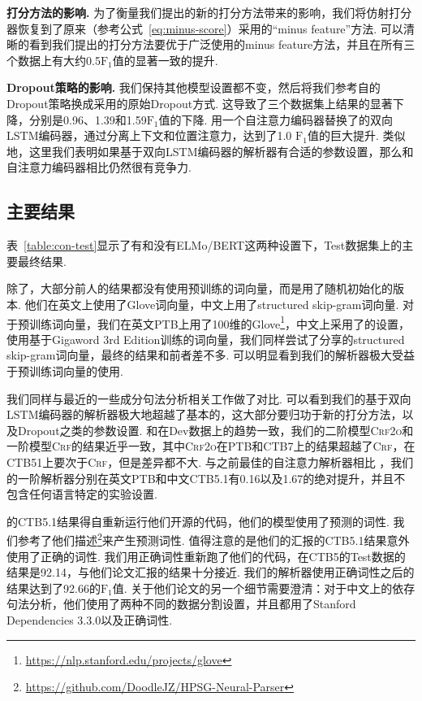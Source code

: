 \noindent\textbf{打分方法的影响.}
为了衡量我们提出的新的打分方法带来的影响，我们将仿射打分器恢复到了原来\citet{stern-etal-2017-minimal}（参考公式~\ref{eq:minus-score}）采用的``minus feature''方法.
可以清晰的看到我们提出的打分方法要优于广泛使用的minus feature方法，并且在所有三个数据上有大约0.5$\mathrm{F}_1$值的显著一致的提升.

\noindent\textbf{Dropout策略的影响.}
我们保持其他模型设置都不变，然后将我们参考自\citet{dozat-etal-2017-biaffine}的Dropout策略换成\citet{stern-etal-2017-minimal}采用的原始Dropout方式.
这导致了三个数据集上结果的显著下降，分别是0.96、1.39和1.59$\mathrm{F}_1$值的下降.
\citet{kitaev-klein-2018-constituency}用一个自注意力编码器替换了\citet{stern-etal-2017-minimal}的双向LSTM编码器，通过分离上下文和位置注意力，达到了1.0 $\mathrm{F}_1$值的巨大提升.
类似地，这里我们表明如果基于双向LSTM编码器的解析器有合适的参数设置，那么和自注意力编码器相比仍然很有竞争力.



\subsection{主要结果}
表~\ref{table:con-test}显示了有和没有ELMo/BERT这两种设置下，Test数据集上的主要最终结果.

除了\citet{zhou-zhao-2019-head}，大部分前人的结果都没有使用预训练的词向量，而是用了随机初始化的版本.
他们在英文上使用了Glove词向量，中文上用了structured skip-gram词向量.
对于预训练词向量，我们在英文PTB上用了100维的Glove\footnote{\url{https://nlp.stanford.edu/projects/glove}}，中文上采用了\citet{li-etal-2019-attentive}的设置，使用基于Gigaword 3rd Edition训练的词向量，我们同样尝试了\citet{zhou-zhao-2019-head}分享的structured skip-gram词向量，最终的结果和前者差不多.
可以明显看到我们的解析器极大受益于预训练词向量的使用.

我们同样与最近的一些成分句法分析相关工作做了对比.
可以看到我们的基于双向LSTM编码器的解析器极大地超越了基本的\citet{stern-etal-2017-minimal}，这大部分要归功于新的打分方法，以及Dropout之类的参数设置.
和在Dev数据上的趋势一致，我们的二阶模型\textsc{Crf2o}和一阶模型\textsc{Crf}的结果近乎一致，其中\textsc{Crf2o}在PTB和CTB7上的结果超越了\textsc{Crf}，在CTB51上要次于\textsc{Crf}，但是差异都不大.
与之前最佳的自注意力解析器相比 \citep{kitaev-klein-2018-constituency}，我们的一阶解析器分别在英文PTB和中文CTB5.1有0.16以及1.67的绝对提升，并且不包含任何语言特定的实验设置.

\citet{zhou-zhao-2019-head}的CTB5.1结果得自重新运行他们开源的代码，他们的模型使用了预测的词性.
我们参考了他们描述\footnote{\url{https://github.com/DoodleJZ/HPSG-Neural-Parser}}来产生预测词性.
值得注意的是他们的汇报的CTB5.1结果意外使用了正确的词性.
我们用正确词性重新跑了他们的代码，在CTB5的Test数据的结果是92.14，与他们论文汇报的结果十分接近.
我们的解析器使用正确词性之后的结果达到了92.66的$\mathrm{F}_1$值.
关于他们论文的另一个细节需要澄清：对于中文上的依存句法分析，他们使用了两种不同的数据分割设置，并且都用了Stanford Dependencies 3.3.0以及正确词性.

